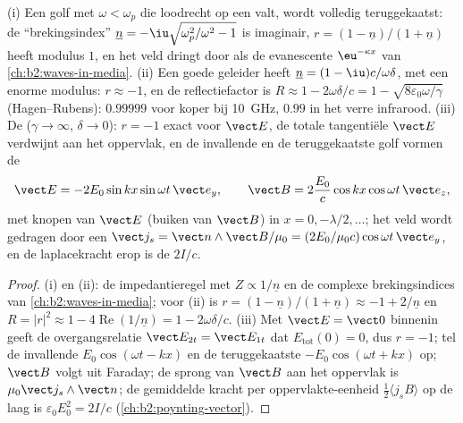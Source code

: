 \begin{proposition}\label{prop:b2:wave-interfaces:conductors}
(i) Een golf met $\omega < \omega_p$ die loodrecht op een  valt, wordt
volledig teruggekaatst: de ``brekingsindex''
$\underline n = -\iu\sqrt{\omega_p^2/\omega^2 - 1}$ is imaginair,
$r = (1 - \underline n)/(1 + \underline n)$ heeft modulus $1$, en het veld
dringt door als de evanescente $\eu^{-\kappa x}$ van
\cref{ch:b2:waves-in-media}. (ii) Een goede geleider heeft
$\underline n = (1 - \iu)c/\omega\delta$, met een enorme modulus:
$r \approx
-1$, en de reflectiefactor is
$R \approx 1 - 2\omega\delta/c = 1 - \sqrt{8\varepsilon_0\omega/\gamma}$
(Hagen--Rubens): $0.99999$ voor koper bij \qty{10}{GHz}, $0.99$ in het verre
infrarood. (iii) De \emph{} ($\gamma \to \infty$,
$\delta \to 0$): $r = -1$ exact voor $\vect E$, de totale tangentiële
$\vect E$ verdwijnt aan het oppervlak, en de invallende en de teruggekaatste
golf vormen de 
\[
\vect E = -2E_0\sin kx\sin\omega t\,\vect e_y , \qquad
\vect B = 2\frac{E_0}c\cos kx\cos\omega t\,\vect e_z ,
\]
met knopen van $\vect E$ (buiken van $\vect B$) in
$x = 0, -\lambda/2, \dots$; het veld wordt gedragen door een
\emph{}
$\vect j_s = \vect n\wedge\vect B/
\mu_0 = (2E_0/\mu_0c)\cos\omega t\,\vect e_y$,
en de laplacekracht erop is de  $2I/c$.
\end{proposition}

\begin{proof}
(i) en (ii): de impedantieregel met $Z \propto 1/\underline n$ en de
complexe brekingsindices van \cref{ch:b2:waves-in-media}; voor (ii) is
$r = (1 - \underline n)/(1 +
\underline n) \approx -1 + 2/\underline n$ en
$R = |r|^2 \approx 1 - 4\operatorname{Re}(1/
\underline n) = 1 - 2\omega\delta/c$.
(iii) Met $\vect E = \vect 0$ binnenin geeft de overgangsrelatie
$\vect E_{2t} = \vect E_{1t}$ dat $E_{\text{tot}}(0) = 0$, dus $r =
-1$; tel
de invallende $E_0\cos(\omega t - kx)$ en de teruggekaatste
$-E_0\cos(\omega t + kx)$ op; $\vect B$ volgt uit Faraday; de sprong van
$\vect B$ aan het oppervlak is $\mu_0\vect j_s
\wedge\vect n$; de gemiddelde
kracht per oppervlakte-eenheid $\tfrac12\langle j_sB\rangle$ op de laag is
$\varepsilon_0E_0^2 = 2I/c$ (\cref{ch:b2:poynting-vector}).
\end{proof}

